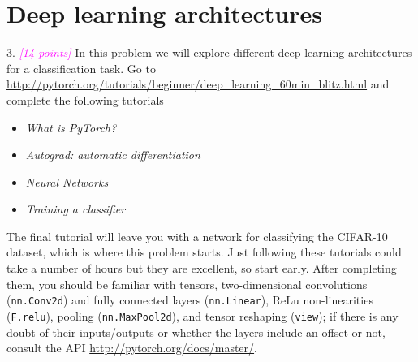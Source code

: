 \documentclass{article}
\newcommand{\1}{\mathbf{1}}
\newcommand{\grade}[1]{\small\textcolor{magenta}{\emph{[#1 points]}} \normalsize}
\begin{document}
\section*{Deep learning architectures}

3. \grade{14} In this problem we will explore different deep learning architectures for a classification task. 
Go to \url{http://pytorch.org/tutorials/beginner/deep_learning_60min_blitz.html} and complete the following tutorials\\[-18pt]
\begin{itemize}
  \item \emph{What is PyTorch?}\\[-18pt]
  \item \emph{Autograd: automatic differentiation}\\[-18pt]
  \item \emph{Neural Networks}\\[-18pt]
  \item \emph{Training a classifier}\\[-18pt]
\end{itemize}
The final tutorial will leave you with a network for classifying the CIFAR-10 dataset, which is where this problem starts. 
Just following these tutorials could take a number of hours but they are excellent, so start early. 
After completing them, you should be familiar with tensors, two-dimensional convolutions (\texttt{nn.Conv2d}) and fully connected layers (\texttt{nn.Linear}), ReLu non-linearities (\texttt{F.relu}), pooling (\texttt{nn.MaxPool2d}), and tensor reshaping (\texttt{view}); if there is any doubt of their inputs/outputs or whether the layers include an offset or not, consult the API \url{http://pytorch.org/docs/master/}. \\
\end{document}
